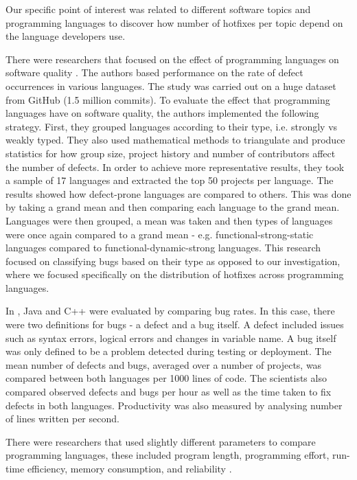 Our specific point of interest was related to different software topics and programming languages to discover how number of hotfixes per topic depend on the language developers use.\par

There were researchers that focused on the effect of programming languages on software quality \cite{Ray2014}. The authors based performance on the rate of defect occurrences in various languages. The study was carried out on a huge dataset from GitHub (1.5 million commits). To evaluate the effect that programming languages have on software quality, the authors implemented the following strategy. First, they grouped languages according to their type, i.e. strongly vs weakly typed. They also used mathematical methods to triangulate and produce statistics for how group size, project history and number of contributors affect the number of defects. In order to achieve more representative results, they took a sample of 17 languages and extracted the top 50 projects per language. The results showed how defect-prone languages are compared to others. This was done by taking a grand mean and then comparing each language to the grand mean. Languages were then grouped, a mean was taken and then types of languages were once again compared to a grand mean - e.g. functional-strong-static languages compared to functional-dynamic-strong languages. This research focused on classifying bugs based on their type as opposed to our investigation, where we focused specifically on the distribution of hotfixes across programming languages.\par

In \cite{Phipps1999}, Java and C++ were evaluated by comparing bug rates. In this case, there were two definitions for bugs - a defect and a bug itself. A defect included issues such as syntax errors, logical errors and changes in variable name. A bug itself was only defined to be a problem detected during testing or deployment. The mean number of defects and bugs, averaged over a number of projects, was compared between both languages per 1000 lines of code. The scientists also compared observed defects and bugs per hour as well as the time taken to fix defects in both languages. Productivity was also measured by analysing number of lines written per second.\par

There were researchers that used slightly different parameters to compare programming languages, these included program length, programming effort, run-time efficiency, memory consumption, and reliability \cite{Prechelt2000}.\par

